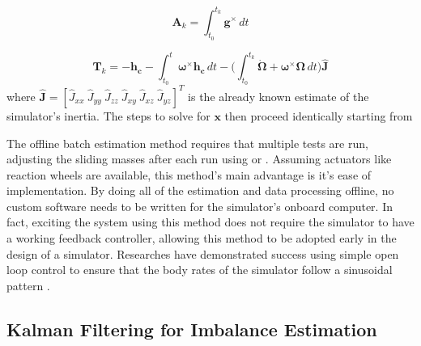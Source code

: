 \begin{equation}
    \bm{A}_k=
    \int_{t_0}^{t_k}\bm{g}^{\times}\,dt
\end{equation}

\begin{equation}
    \bm{T}_k=-{\bm{h_c}} - \int_{t_0}^{t}\bm{\omega}^{\times}\bm{h_c}\,dt
    - \biggl(
    \int_{t_0}^{t_k}\dot{\bm{\Omega}} + \bm{\omega}^{\times}\bm{\Omega}\,dt
    \biggl)
    \hat{\bm{J}}
\end{equation}
where $\hat{\bm{J}}= [\hat{J}_{xx}\ \hat{J}_{yy}\ \hat{J}_{zz}\ \hat{J}_{xy}\ \hat{J}_{xz}\ \hat{J}_{yz}]^T$ is the already known estimate of the simulator's inertia. The steps to solve for $\bm{x}$ then proceed identically starting from 

The offline batch estimation method requires that multiple tests are run, adjusting the sliding masses after each run using  or . Assuming actuators like reaction wheels are available, this method's main advantage is it's ease of implementation. By doing all of the estimation and data processing offline, no custom software needs to be written for the simulator's onboard computer. In fact, exciting the system using this method does not require the simulator to have a working feedback controller, allowing this method to be adopted early in the design of a simulator. Researches have demonstrated success using simple open loop control to ensure that the body rates of the simulator follow a sinusoidal pattern \cite{kim_automatic_2009} \cite{dam_applied_2014} \cite{noauthor_designing_2003}.

\subsection{Kalman Filtering for Imbalance Estimation}\label{sec:UKF}

